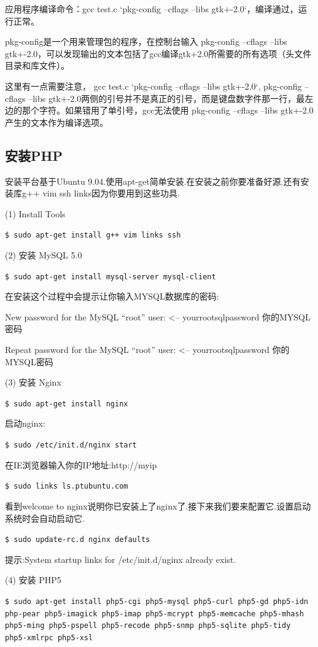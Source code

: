 应用程序编译命令：gcc test.c `pkg-config --cflags --libs gtk+-2.0`，编译通过，运行正常。

pkg-config是一个用来管理包的程序，在控制台输入 pkg-config --cflags --libs gtk+-2.0，可以发现输出的文本包括了gcc编译gtk+2.0所需要的所有选项（头文件目录和库文件）。

这里有一点需要注意， gcc test.c `pkg-config --cflags --libs gtk+-2.0`, pkg-config --cflags --libs gtk+-2.0两侧的引号并不是真正的引号，而是键盘数字件那一行，最左边的那个字符。如果错用了单引号，gcc无法使用 pkg-config --cflags --libs gtk+-2.0产生的文本作为编译选项。

\subsection{安装PHP}
安装平台基于Ubuntu 9.04.使用apt-get简单安装.在安装之前你要准备好源.还有安装库g++ vim ssh links因为你要用到这些功具.

(1) Install Tools

\verb"$ sudo apt-get install g++ vim links ssh"

(2) 安装 MySQL 5.0

\verb"$ sudo apt-get install mysql-server mysql-client"

在安装这个过程中会提示让你输入MYSQL数据库的密码:

New password for the MySQL “root” user: <– yourrootsqlpassword 你的MYSQL密码

Repeat password for the MySQL “root” user: <– yourrootsqlpassword 你的MYSQL密码

(3) 安装 Nginx

\verb"$ sudo apt-get install nginx"

启动nginx:

\verb"$ sudo /etc/init.d/nginx start"

在IE浏览器输入你的IP地址:http://myip

\verb"$ sudo links ls.ptubuntu.com"

看到welcome to nginx说明你已安装上了nginx了.接下来我们要来配置它.设置启动系统时会自动启动它.

\verb"$ sudo update-rc.d nginx defaults"

提示:System startup links for /etc/init.d/nginx already exist.

(4) 安装 PHP5

\verb"$ sudo apt-get install php5-cgi php5-mysql php5-curl php5-gd php5-idn php-pear php5-imagick php5-imap php5-mcrypt php5-memcache php5-mhash php5-ming php5-pspell php5-recode php5-snmp php5-sqlite php5-tidy php5-xmlrpc php5-xsl"

